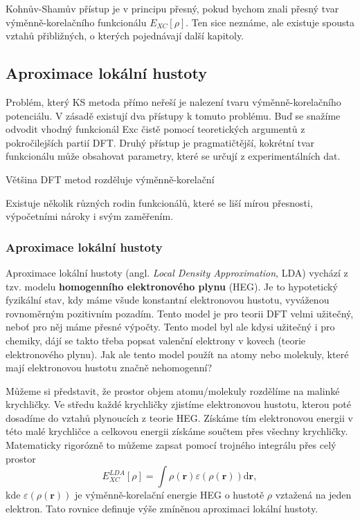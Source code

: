 Kohnův-Shamův přístup je v principu přesný, pokud bychom znali přesný tvar výměnně-korelačního funkcionálu $E_{XC}[\rho]$.
Ten sice neznáme, ale existuje spousta vztahů přibližných, o kterých pojednávají další kapitoly.


\subsection{Aproximace lokální hustoty}
Problém, který KS metoda přímo neřeší je nalezení tvaru výměnně-korelačního potenciálu.
V zásadě existují dva přístupy k tomuto problému. Buď se snažíme odvodit vhodný funkcionál Exc čistě pomocí teoretických argumentů z pokročilejších partií DFT. Druhý přístup je pragmatičtější, kokrétní tvar funkcionálu může obsahovat parametry, které se určují z experimentálních dat.

Většina DFT metod rozděluje výměnně-korelační 

Existuje několik různých rodin funkcionálů, které se liší mírou přesnosti, výpočetními nároky i svým zaměřením.

\subsubsection{Aproximace lokální hustoty}
Aproximace lokální hustoty (angl. \textit{Local Density Approximation}, LDA) vychází z tzv. modelu \textbf{homogenního elektronového plynu} (HEG). Je to hypotetický fyzikální stav, kdy máme všude konstantní elektronovou hustotu, vyváženou rovnoměrným pozitivním pozadím. Tento model je pro teorii DFT velmi užitečný, neboť pro něj máme přesné výpočty. Tento model byl ale kdysi užitečný i pro chemiky, dájí se takto třeba popsat valenční elektrony v kovech (teorie elektronového plynu). Jak ale tento model použít na atomy nebo molekuly, které mají elektronovou hustotu značně nehomogenní?

Můžeme si představit, že prostor objem atomu/molekuly rozdělíme na malinké krychličky. Ve středu každé krychličky zjistíme elektronovou hustotu, kterou poté dosadíme do vztahů plynoucích z teorie HEG.
Získáme tím elektronovou energii v této malé krychličce a celkovou energii získáme součtem přes všechny krychličky. Matematicky rigorózně to můžeme zapsat pomocí trojného integrálu přes celý prostor
\begin{equation}
E_{XC}^{LDA}[\rho]=\int \rho(\textbf{r}) \varepsilon(\rho(\textbf{r})) \mathrm{d}\textbf{r} ,
\end{equation}
kde $\varepsilon(\rho(\textbf{r}))$ je výměnně-korelační energie HEG o hustotě $\rho$ vztažená na jeden elektron. Tato rovnice definuje výše zmíněnou aproximaci lokální hustoty.

